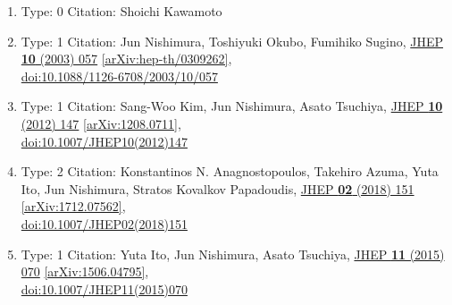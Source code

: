 \documentclass[a4paper,10pt]{article}
\begin{document}
\begin{enumerate}
\begin{enumerate}
  \item Type: 0 Citation: Shoichi Kawamoto
  \item Type: 1 Citation: Jun Nishimura, Toshiyuki Okubo, Fumihiko Sugino, \href{https://www.doi.org/10.1088/1126-6708/2003/10/057}{JHEP {\bf 10} (2003) 057}  \href{https://arxiv.org/abs/hep-th/0309262}{[arXiv:hep-th/0309262]},\\\href{https://www.doi.org/10.1088/1126-6708/2003/10/057}{doi:10.1088/1126-6708/2003/10/057}
  \item Type: 1 Citation: Sang-Woo Kim, Jun Nishimura, Asato Tsuchiya, \href{https://www.doi.org/10.1007/JHEP10(2012)147}{JHEP {\bf 10} (2012) 147}  \href{https://arxiv.org/abs/1208.0711}{[arXiv:1208.0711]},\\\href{https://www.doi.org/10.1007/JHEP10(2012)147}{doi:10.1007/JHEP10(2012)147}
  \item Type: 2 Citation: Konstantinos N. Anagnostopoulos, Takehiro Azuma, Yuta Ito, Jun Nishimura, Stratos Kovalkov Papadoudis, \href{https://www.doi.org/10.1007/JHEP02(2018)151}{JHEP {\bf 02} (2018) 151}  \href{https://arxiv.org/abs/1712.07562}{[arXiv:1712.07562]},\\\href{https://www.doi.org/10.1007/JHEP02(2018)151}{doi:10.1007/JHEP02(2018)151}
  \item Type: 1 Citation: Yuta Ito, Jun Nishimura, Asato Tsuchiya, \href{https://www.doi.org/10.1007/JHEP11(2015)070}{JHEP {\bf 11} (2015) 070}  \href{https://arxiv.org/abs/1506.04795}{[arXiv:1506.04795]},\\\href{https://www.doi.org/10.1007/JHEP11(2015)070}{doi:10.1007/JHEP11(2015)070}

\end{enumerate}
\end{enumerate}
\end{document}
